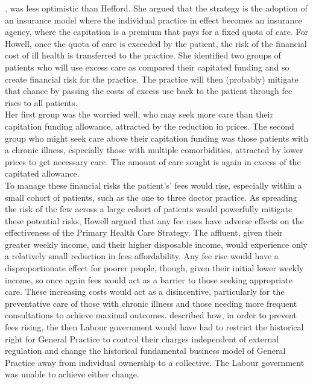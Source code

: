 \documentclass[11pt,a4paper]{article}
\begin{document}
\citet{howell2005restructuring}, was less optimistic than Hefford. She argued that the strategy is the adoption of an insurance model where the individual practice in effect becomes an insurance agency, where the capitation is a premium that pays for a fixed quota of care. For Howell, once the quota of care is exceeded by the patient, the risk of the financial cost of ill health is transferred to the practice. She identified two groups of patients who will use excess care as compared their capitated funding and so create financial risk for the practice. The practice will then (probably) mitigate that chance by passing the costs of excess use back to the patient through fee rises to all patients.\\


Her first group was the worried well, who may seek more care than their capitation funding allowance, attracted by the reduction in prices. The second group who might seek care above their capitation funding was those patients with a chronic illness, especially those with multiple comorbidities, attracted by lower prices to get necessary care. The amount of care sought is again in excess of the capitated allowance.\\  


To manage these financial risks the patient's’ fees would rise, especially within a small cohort of patients, such as the one to three doctor practice. As spreading the risk of the few across a large cohort of patients would powerfully mitigate these potential risks, Howell argued that any fee rises have adverse effects on the effectiveness of the Primary Health Care Strategy. The affluent, given their greater weekly income, and their higher disposable income,  would experience only a relatively small reduction in fees affordability. Any fee rise would have a disproportionate effect for poorer people, though, given their initial lower weekly income, so once again fees would act as a barrier to those seeking appropriate care. These increasing costs would act as a disincentive, particularly for the preventative care of those with chronic illness and those needing more frequent consultations to achieve maximal outcomes.  \citet{howell2005restructuring} described how, in order to prevent fees rising, the then Labour government would have had to restrict the historical right for General Practice to control their charges independent of external regulation and change the historical fundamental business model of General Practice away from individual ownership to a collective.  The Labour government was unable to achieve either change.  \\
\end{document}
